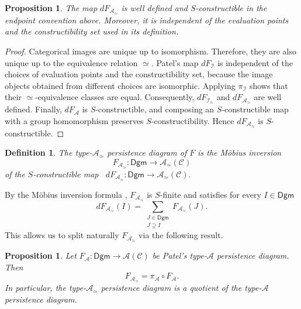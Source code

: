 \documentclass{amsart}
\newtheorem{proposition}[theorem]{Proposition}
\newtheorem{definition}[theorem]{Definition}
\begin{document}
\begin{proposition}
The map $dF_{\mathcal{A}_{\simeq}}$ is well defined and
$S$-constructible in the endpoint convention above. Moreover, it is independent of the evaluation points and the constructibility set used in its definition.
\end{proposition}

\begin{proof}
Categorical images are unique up to isomorphism. Therefore, they are
also unique up to the equivalence relation $\simeq$. Patel's map $dF_{\mathcal I}$ \cite[Section~7]{patel2016generalized} is independent of the choices of evaluation points and the constructibility set, because the image
objects obtained from different choices are isomorphic. Applying
$\pi_{\mathcal I}$ shows that their $\simeq$-equivalence classes
are equal. Consequently, $dF_{\mathcal{I}_{\simeq}}$ and
$dF_{\mathcal{A}_{\simeq}}$ are well defined. Finally, $dF_{\mathcal A}$ is $S$-constructible, and composing an
$S$-constructible map with a group homomorphism preserves
$S$-constructibility. Hence
$dF_{\mathcal{A}_{\simeq}}$ is $S$-constructible.
\end{proof}

\begin{definition}
The \textit{type-$\mathcal{A}_{\simeq}$ persistence diagram} of $F$
is the Möbius inversion
\[
F_{\mathcal{A}_{\simeq}}
\colon
\mathsf{Dgm}
\longrightarrow
\mathcal{A}_{\simeq}(\mathcal{C})
\]
of the $S$-constructible map \, 
$dF_{\mathcal{A}_{\simeq}}
\colon
\mathsf{Dgm}
\longrightarrow
\mathcal{A}_{\simeq}(\mathcal{C}).$
\end{definition}

By the M\"obius inversion formula \cite[Theorem~4.1]{patel2016generalized},
$F_{\mathcal{A}_{\simeq}}$ is $S$-finite and satisfies
for every $I\in\mathsf{Dgm}$ \[
dF_{\mathcal{A}_{\simeq}}(I)
=
\sum_{\substack{J\in\mathsf{Dgm}\\J\supseteq I}}
F_{\mathcal{A}_{\simeq}}(J).
\]
This allows us to split naturally  $F_{\mathcal{A}_{\simeq}}$ via the following result.
\begin{proposition}
Let
 $F_{\mathcal A}\colon
\mathsf{Dgm}\longrightarrow\mathcal{A}(\mathcal{C})$
be Patel's type-$\mathcal A$ persistence diagram. Then
\[F_{\mathcal{A}_{\simeq}}
=
\pi_{\mathcal A}\circ F_{\mathcal A}.\]
In particular, the type-$\mathcal{A}_{\simeq}$ persistence diagram
is a quotient of the type-$\mathcal A$ persistence diagram.
\end{proposition}
\end{document}
